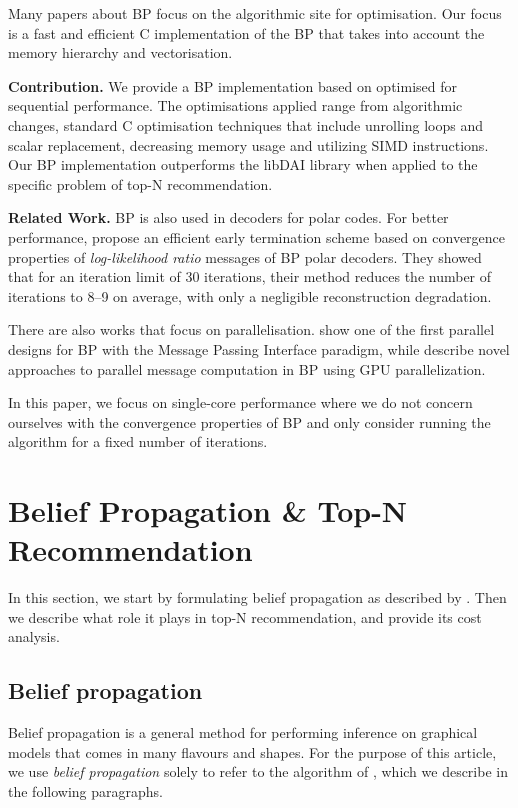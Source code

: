 \documentclass[draft,letterpaper]{article}
\newcommand{\mypar}[1]{{\bf #1.}}
\begin{document}
Many papers about BP focus on the algorithmic site for optimisation. Our focus is a fast and efficient C implementation of the BP that takes into account the memory hierarchy and vectorisation.

\mypar{Contribution}
We provide a BP implementation based on \citet{top-n-recommendation} optimised for sequential performance. The optimisations applied range from algorithmic changes, standard C optimisation techniques that include unrolling loops and scalar replacement, decreasing memory usage and utilizing SIMD instructions. Our BP implementation outperforms the libDAI library \cite{libdai} when applied to the specific problem of top-N recommendation. 

\mypar{Related Work}
BP is also used in decoders for polar codes. For better performance, \citet{related1} propose an efficient early termination scheme based on convergence properties of \emph{log-likelihood ratio} messages of BP polar decoders. They showed that for an iteration limit of 30 iterations, their method reduces the number of iterations to 8--9 on average, with only a negligible reconstruction degradation.

There are also works that focus on parallelisation. \citet{related2} show one of the first parallel designs for BP with the Message Passing Interface paradigm, while \citet{related3} describe novel approaches to parallel message computation in BP using GPU parallelization.

In this paper, we focus on single-core performance where we do not concern ourselves with the convergence properties of BP and only consider running the algorithm for a fixed number of iterations.

\section{Belief Propagation \& Top-N Recommendation}\label{sec:background}

In this section, we start by formulating belief propagation as described by \citet{top-n-recommendation}. Then we describe what role it plays in top-N
recommendation, and provide its cost analysis.

\subsection{Belief propagation} \label{subsec:bp}

Belief propagation is a general method for performing inference on
graphical models that comes in many flavours and shapes. For the purpose of
this article, we use \emph{belief propagation} solely to refer to the algorithm
of \citet[Section 2.1]{top-n-recommendation}, which we describe in the
following paragraphs.
\end{document}
